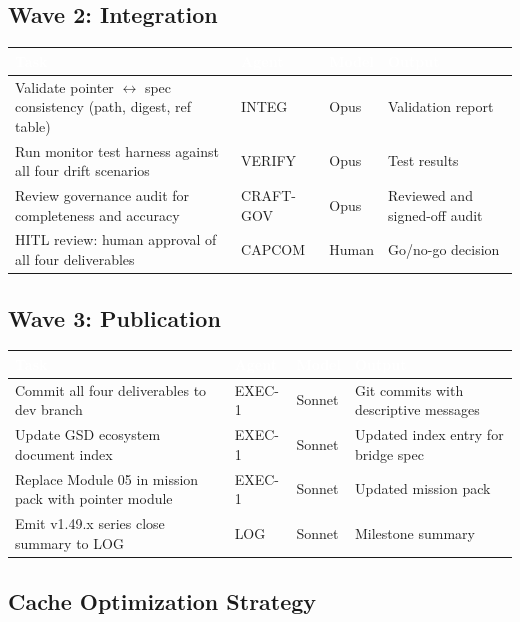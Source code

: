 \documentclass[11pt,letterpaper]{article}
\newcommand{\tableheader}[1]{\textbf{\sffamily\textcolor{white}{#1}}}
\begin{document}
\subsection{Wave 2: Integration}

\begin{center}
\begin{tabularx}{\textwidth}{L{3.5cm}L{2.5cm}L{2cm}X}
\toprule
{}
\tableheader{Task} & \tableheader{Agent} & \tableheader{Model} & \tableheader{Output} \\
\midrule
Validate pointer $\leftrightarrow$ spec consistency (path, digest, ref table) & INTEG & Opus & Validation report \\
Run monitor test harness against all four drift scenarios & VERIFY & Opus & Test results \\
Review governance audit for completeness and accuracy & CRAFT-GOV & Opus & Reviewed and signed-off audit \\
HITL review: human approval of all four deliverables & CAPCOM & Human & Go/no-go decision \\
\bottomrule
\end{tabularx}
\end{center}

\subsection{Wave 3: Publication}

\begin{center}
\begin{tabularx}{\textwidth}{L{3.5cm}L{2.5cm}L{2cm}X}
\toprule
{}
\tableheader{Task} & \tableheader{Agent} & \tableheader{Model} & \tableheader{Output} \\
\midrule
Commit all four deliverables to dev branch & EXEC-1 & Sonnet & Git commits with descriptive messages \\
Update GSD ecosystem document index & EXEC-1 & Sonnet & Updated index entry for bridge spec \\
Replace Module 05 in mission pack with pointer module & EXEC-1 & Sonnet & Updated mission pack \\
Emit v1.49.x series close summary to LOG & LOG & Sonnet & Milestone summary \\
\bottomrule
\end{tabularx}
\end{center}

\subsection{Cache Optimization Strategy}
\end{document}
